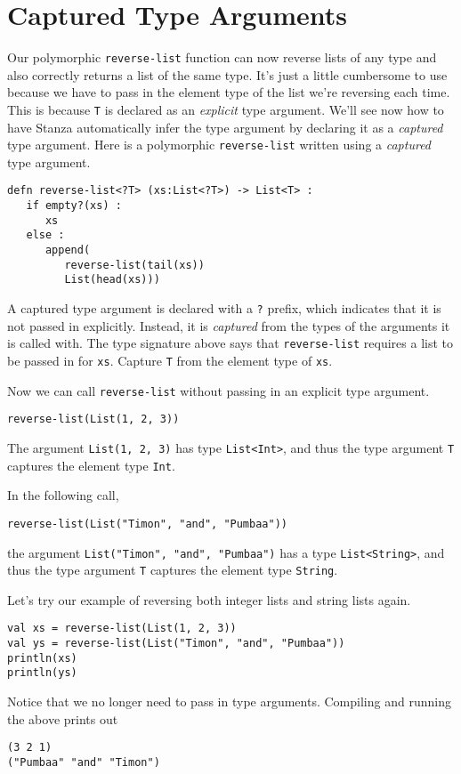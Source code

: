 \documentclass[10pt,oneside]{book}
\begin{document}
\section{Captured Type Arguments}
Our polymorphic \texttt{\frenchspacing reverse-list} function can now reverse lists of any type and also correctly returns a list of the same type. It's just a little cumbersome to use because we have to pass in the element type of the list we're reversing each time. This is because \texttt{\frenchspacing T} is declared as an {\em explicit} type argument. We'll see now how to have Stanza automatically infer the type argument by declaring it as a {\em captured} type argument.
Here is a polymorphic \texttt{\frenchspacing reverse-list} written using a {\em captured} type argument.
\begin{lstlisting}
defn reverse-list<?T> (xs:List<?T>) -> List<T> :
   if empty?(xs) :
      xs
   else :
      append(
         reverse-list(tail(xs))
         List(head(xs)))
\end{lstlisting}
A captured type argument is declared with a \texttt{\frenchspacing ?} prefix, which indicates that it is not passed in explicitly. Instead, it is {\em captured} from the types of the arguments it is called with. The type signature above says that \texttt{\frenchspacing reverse-list} requires a list to be passed in for \texttt{\frenchspacing xs}. Capture \texttt{\frenchspacing T} from the element type of \texttt{\frenchspacing xs}. 

Now we can call \texttt{\frenchspacing reverse-list} without passing in an explicit type argument.
\begin{lstlisting}
reverse-list(List(1, 2, 3))
\end{lstlisting}
The argument \texttt{\frenchspacing List(1, 2, 3)} has type \texttt{\frenchspacing List<Int>}, and thus the type argument \texttt{\frenchspacing T} captures the element type \texttt{\frenchspacing Int}. 

In the following call,
\begin{lstlisting}
reverse-list(List("Timon", "and", "Pumbaa"))
\end{lstlisting}
the argument \texttt{\frenchspacing List("Timon", "and", "Pumbaa")} has a type \texttt{\frenchspacing List<String>}, and thus the type argument \texttt{\frenchspacing T} captures the element type \texttt{\frenchspacing String}. 

Let's try our example of reversing both integer lists and string lists again.
\begin{lstlisting}
val xs = reverse-list(List(1, 2, 3))
val ys = reverse-list(List("Timon", "and", "Pumbaa"))
println(xs)
println(ys)
\end{lstlisting}
Notice that we no longer need to pass in type arguments. Compiling and running the above prints out
\begin{lstlisting}
(3 2 1)
("Pumbaa" "and" "Timon")
\end{lstlisting}
\end{document}
